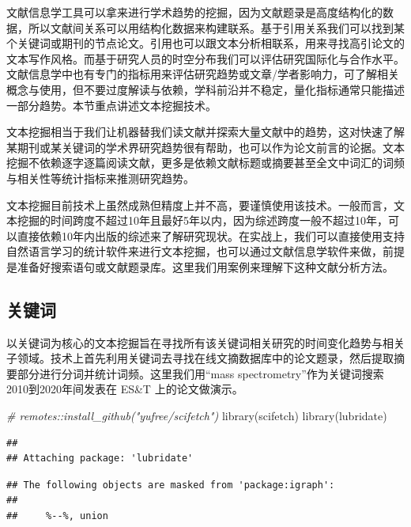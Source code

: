 \documentclass[]{tufte-book}
\newenvironment{Shaded}{}{}
\newcommand{\CommentTok}[1]{\textcolor[rgb]{0.38,0.63,0.69}{\textit{#1}}}
\newcommand{\FunctionTok}[1]{\textcolor[rgb]{0.02,0.16,0.49}{#1}}
\newcommand{\NormalTok}[1]{#1}
\begin{document}
文献信息学工具可以拿来进行学术趋势的挖掘，因为文献题录是高度结构化的数据，所以文献间关系可以用结构化数据来构建联系。基于引用关系我们可以找到某个关键词或期刊的节点论文。引用也可以跟文本分析相联系，用来寻找高引论文的文本写作风格。而基于研究人员的时空分布我们可以评估研究国际化与合作水平。文献信息学中也有专门的指标用来评估研究趋势或文章/学者影响力，可了解相关概念与使用，但不要过度解读与依赖，学科前沿并不稳定，量化指标通常只能描述一部分趋势。本节重点讲述文本挖掘技术。

文本挖掘相当于我们让机器替我们读文献并探索大量文献中的趋势，这对快速了解某期刊或某关键词的学术界研究趋势很有帮助，也可以作为论文前言的论据。文本挖掘不依赖逐字逐篇阅读文献，更多是依赖文献标题或摘要甚至全文中词汇的词频与相关性等统计指标来推测研究趋势。

文本挖掘目前技术上虽然成熟但精度上并不高，要谨慎使用该技术。一般而言，文本挖掘的时间跨度不超过10年且最好5年以内，因为综述跨度一般不超过10年，可以直接依赖10年内出版的综述来了解研究现状。在实战上，我们可以直接使用支持自然语言学习的统计软件来进行文本挖掘，也可以通过文献信息学软件来做，前提是准备好搜索语句或文献题录库。这里我们用案例来理解下这种文献分析方法。

\hypertarget{ux5173ux952eux8bcd}{%
\subsection{关键词}\label{ux5173ux952eux8bcd}}

以关键词为核心的文本挖掘旨在寻找所有该关键词相关研究的时间变化趋势与相关子领域。技术上首先利用关键词去寻找在线文摘数据库中的论文题录，然后提取摘要部分进行分词并统计词频。这里我们用``mass spectrometry''作为关键词搜索2010到2020年间发表在 ES\&T 上的论文做演示。

\begin{Shaded}
\begin{Highlighting}[]
\CommentTok{\# remotes::install\_github("yufree/scifetch")}
\FunctionTok{library}\NormalTok{(scifetch)}
\FunctionTok{library}\NormalTok{(lubridate)}
\end{Highlighting}
\end{Shaded}

\begin{verbatim}
## 
## Attaching package: 'lubridate'
\end{verbatim}

\begin{verbatim}
## The following objects are masked from 'package:igraph':
## 
##     %--%, union
\end{verbatim}
\end{document}
